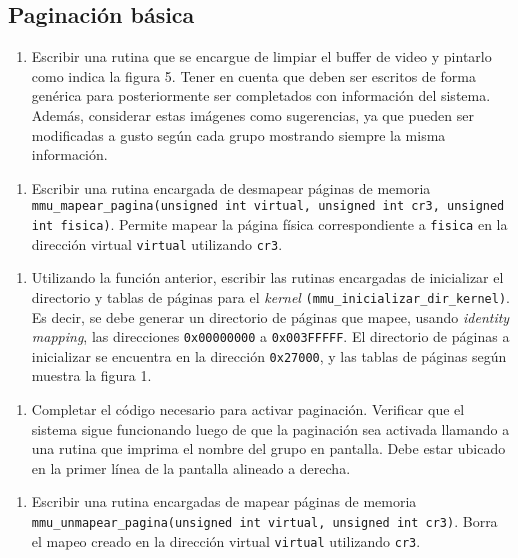   \subsection{Paginación básica}
    \begin{enumerate}[label=(\alph*)]
      \item Escribir una rutina que se encargue de limpiar el buffer de video y pintarlo como indica la figura 5. Tener en cuenta que deben ser escritos de forma genérica para posteriormente ser completados con información del sistema. Además, considerar estas imágenes como sugerencias, ya que pueden ser modificadas a gusto según cada grupo mostrando siempre la misma información.
    \end{enumerate}

    \begin{enumerate}[resume,label=(\alph*)]
      \item Escribir una rutina encargada de desmapear páginas de memoria \texttt{mmu\_mapear\_pagina(unsigned int virtual, unsigned int cr3, unsigned int fisica)}. Permite mapear la página física correspondiente a \texttt{fisica} en la dirección virtual \texttt{virtual} utilizando \texttt{cr3}.
    \end{enumerate}

    \begin{enumerate}[resume,label=(\alph*)]
      \item Utilizando la función anterior, escribir las rutinas encargadas de inicializar el directorio y tablas de páginas para el \emph{kernel} \texttt{(mmu\_inicializar\_dir\_kernel)}. Es decir, se debe generar un directorio de páginas que mapee, usando \emph{identity mapping}, las direcciones \texttt{0x00000000} a \texttt{0x003FFFFF}. El directorio de páginas a inicializar se encuentra en la dirección \texttt{0x27000}, y las tablas de páginas según muestra la figura 1.
    \end{enumerate}

    \begin{enumerate}[resume,label=(\alph*)]
      \item Completar el código necesario para activar paginación. Verificar que el sistema sigue funcionando luego de que la paginación sea activada llamando a una rutina que imprima el nombre del grupo en pantalla. Debe estar ubicado en la primer línea de la pantalla alineado a derecha.
    \end{enumerate}

    \begin{enumerate}[resume,label=(\alph*)]
      \item Escribir una rutina encargadas de mapear páginas de memoria \texttt{mmu\_unmapear\_pagina(unsigned int virtual, unsigned int cr3)}. Borra el mapeo creado en la dirección virtual \texttt{virtual} utilizando \texttt{cr3}.
    \end{enumerate}

